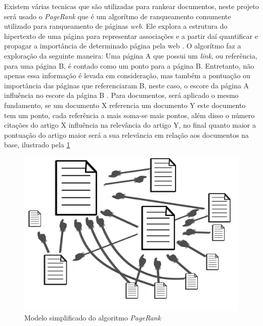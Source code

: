 Existem várias tecnicas que são utilizadas para rankear documentos, neste projeto será usado o \textit{PageRank} que é um algorítmo de ranqueamento comumente utilizado para ranqueamento de páginas \textit{web}. Ele explora a estrutura do hipertexto de uma página para representar associações e a partir daí quantificar e propagar a importância de determinado página pela web \cite{langville2011google}.
O algorítmo faz a exploração da seguinte maneira: Uma página A que possui um \textit{link}, ou referência, para uma página B, é contado como um ponto para a página B. Entretanto, não apenas essa informação é levada em consideração, mas também a pontuação ou importância das páginas que referenciaram B, neste caso, o escore da página A influência no escore da página B \cite{de2006mecanismos}. 
Para documentos, será aplicado o mesmo fundamento, se um documento X referencia um documento Y este documento tem um ponto, cada referência a mais soma-se mais pontos, além disso o número citações do artigo X influência na relevância do artigo Y, no final quanto maior a pontuação do artigo maior será a sua relevância em relação aos documentos na base, ilustrado pela \ref{pagerankfig}

\begin{figure}[htb]
		\begin{center}
			\includegraphics[width=13cm]{images/pagerankgex.png}
            \caption{Modelo simplificado do algoritmo \textit{PageRank}}
            
	\label{pagerankfig}
		\end{center}
	\end{figure}



